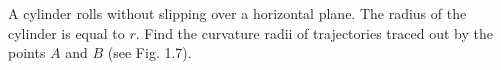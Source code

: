 \item A cylinder rolls without slipping over a horizontal plane. The radius of the cylinder is equal to \( r \). Find the curvature radii of trajectories traced out by the points \( A \) and \( B \) (see Fig. 1.7).